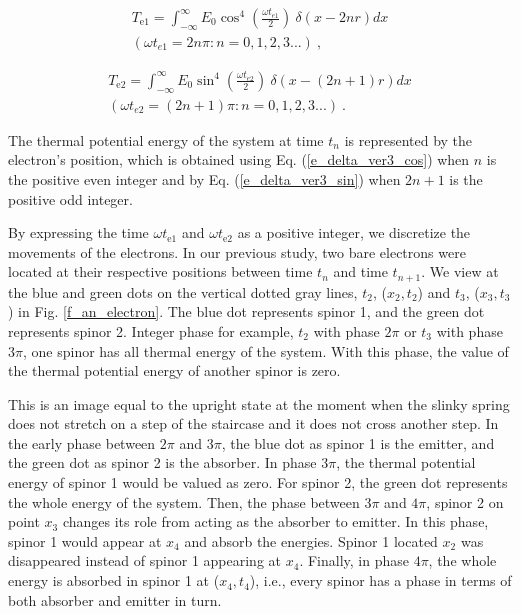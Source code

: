 \documentclass[reprint,amsmath,amssymb,aps,draft]{revtex4-1}
\numberwithin{equation}{section}%
\begin{document}
        \begin{equation}
        \begin{split}
            T_{\mathrm{e1}} = \int_{-\infty}^{\infty} E_{0} \cos^{4} \left( \frac{\omega t_{e1}}{2} \right) \ \delta(x - 2 n r)dx \\
            (\omega t_{e1} = 2n \pi : n = 0,1,2,3...)
            \ ,
        \end{split}
            \label{e_delta_ver3_cos}
        \end{equation}
        
        \begin{equation}
        \begin{split}
            T_{\mathrm{e2}} = \int_{-\infty}^{\infty} E_{0} \sin^{4} \left( \frac{\omega t_{e2}}{2} \right) \ \delta(x - (2 n + 1) r ) dx \\
            (\omega t_{e2} = (2n+1) \pi : n = 0,1,2,3...)
            \ .
        \end{split}
            \label{e_delta_ver3_sin}
        \end{equation}


    The thermal potential energy of the system at time $t_{n}$ is represented by the electron's position, which is obtained using Eq. (\ref{e_delta_ver3_cos}) when $n$ is the positive even integer and by Eq. (\ref{e_delta_ver3_sin}) when $2n + 1$ is the positive odd integer.
    
    By expressing the time $\omega t_{\mathrm{e1}}$ and $\omega t_{\mathrm{e2}}$ as a positive integer, we discretize the movements of the electrons. In our previous study, two bare electrons were located at their respective positions between time $t_{n}$ and time $t_{n+1}$. We view at the blue and green dots on the vertical dotted gray lines, $t_{2}$, ($x_{2}, t_{2}$) and $t_{3}$, ($x_{3}, t_{3}$) in Fig. \ref{f_an_electron}. The blue dot represents spinor 1, and the green dot represents spinor 2. Integer phase for example, $t_{2}$ with phase $2\pi$ or $t_{3}$ with phase $3\pi$, one spinor has all thermal energy of the system. With this phase, the value of the thermal potential energy of another spinor is zero.
    
    This is an image equal to the upright state at the moment when the slinky spring does not stretch on a step of the staircase and it does not cross another step. In the early phase between $2\pi$ and $3\pi$, the blue dot as spinor 1 is the emitter, and the green dot as spinor 2 is the absorber. In phase $3\pi$, the thermal potential energy of spinor 1 would be valued as zero. For spinor 2, the green dot represents the whole energy of the system. Then, the phase between $3\pi$ and $4\pi$, spinor 2 on point $x_{3}$ changes its role from acting as the absorber to emitter. In this phase, spinor 1 would appear at $x_{4}$ and absorb the energies. Spinor 1 located $x_{2}$ was disappeared instead of spinor 1 appearing at $x_{4}$. Finally, in phase $4\pi$, the whole energy is absorbed in spinor 1 at ($x_{4}, t_{4}$), i.e., every spinor has a phase in terms of both absorber and emitter in turn.
    
\end{document}
